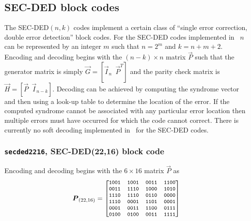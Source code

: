\subsection{SEC-DED block codes}
\label{module:fec:secded}
The SEC-DED$(n,k)$ codes implement a certain class of ``single error
correction, double error detection'' block codes.
%
For the SEC-DED codes implemented in \liquid\, $n$ can be represented
by an integer $m$ such that $n=2^m$ and $k = n + m + 2$.
%
Encoding and decoding begins with the $(n-k) \times n$ matrix $\vec{P}$
such that
the generator matrix is simply
$\vec{G} = \left[ \vec{I}_{n} \,\,\, \vec{P}^T \right]$
and the parity check matrix is
$\vec{H} = \left[ \vec{P} \,\,\, \vec{I}_{n-k} \right]$.
%
Decoding can be achieved by computing the syndrome vector and then using
a look-up table to determine the location of the error.
If the computed syndrome cannot be associated with any particular error
location then multiple errors must have occurred for which the code
cannot correct.
%
There is currently no soft decoding implemented in \liquid\ for the
SEC-DED codes.

\subsubsection{{\tt secded2216}, SEC-DED(22,16) block code}
\label{module:fec:secded:2216}
%
Encoding and decoding begins with the $6 \times 16$ matrix $\vec{P}$ as
%
\begin{equation*}
    \vec{P}_{(22,16)} = 
    \footnotesize{
    \begin{bmatrix}
        {\tt 1001} & {\tt 1001} & {\tt 0011} & {\tt 1100} \\
        {\tt 0011} & {\tt 1110} & {\tt 1000} & {\tt 1010} \\
        {\tt 1110} & {\tt 1110} & {\tt 0110} & {\tt 0000} \\
        {\tt 1110} & {\tt 0001} & {\tt 1101} & {\tt 0001} \\
        {\tt 0001} & {\tt 0011} & {\tt 1100} & {\tt 0111} \\
        {\tt 0100} & {\tt 0100} & {\tt 0011} & {\tt 1111} \\
    \end{bmatrix}
    }
\end{equation*}
%

